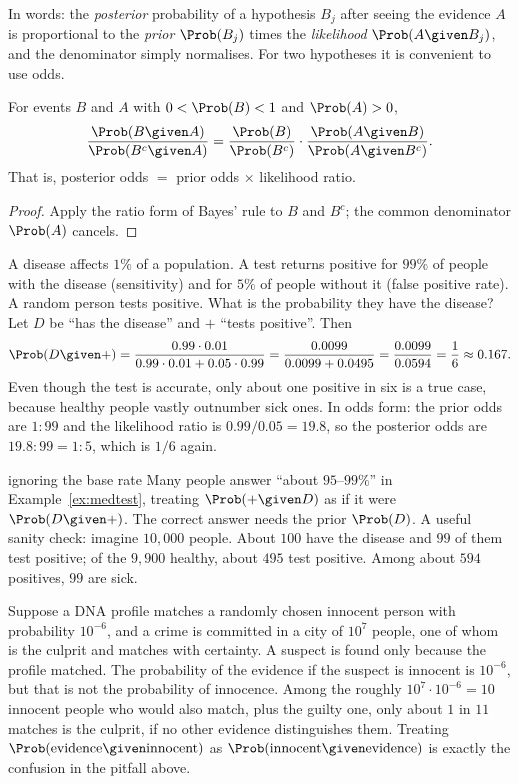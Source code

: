 In words: the \emph{posterior} probability of a hypothesis $B_j$ after seeing the
evidence $A$ is proportional to the \emph{prior} $\Prob(B_j)$ times the
\emph{likelihood} $\Prob(A\given B_j)$, and the denominator simply normalises.
For two hypotheses it is convenient to use odds.

\begin{corollary}
For events $B$ and $A$ with $0<\Prob(B)<1$ and $\Prob(A)>0$,
\[
\frac{\Prob(B\given A)}{\Prob(B^c\given A)}
=\frac{\Prob(B)}{\Prob(B^c)}\cdot\frac{\Prob(A\given B)}{\Prob(A\given B^c)} .
\]
That is, posterior odds $=$ prior odds $\times$ likelihood ratio.
\end{corollary}
\begin{proof}
Apply the ratio form of Bayes' rule to $B$ and $B^c$; the common denominator
$\Prob(A)$ cancels.
\end{proof}

\begin{example}\label{ex:medtest}
A disease affects $1\%$ of a population. A test returns positive for $99\%$ of
people with the disease (sensitivity) and for $5\%$ of people without it (false
positive rate). A random person tests positive. What is the probability they
have the disease? Let $D$ be ``has the disease'' and $+$ ``tests positive''.
Then
\[
\Prob(D\given +)=\frac{0.99\cdot0.01}{0.99\cdot0.01+0.05\cdot0.99}
=\frac{0.0099}{0.0099+0.0495}=\frac{0.0099}{0.0594}=\frac16\approx0.167 .
\]
Even though the test is accurate, only about one positive in six is a true case,
because healthy people vastly outnumber sick ones. In odds form: the prior odds
are $1:99$ and the likelihood ratio is $0.99/0.05=19.8$, so the posterior odds
are $19.8:99=1:5$, which is $1/6$ again.
\end{example}

\begin{pitfall}{ignoring the base rate}
Many people answer ``about $95$--$99\%$'' in Example~\ref{ex:medtest}, treating
$\Prob(+\given D)$ as if it were $\Prob(D\given +)$. The correct answer needs
the prior $\Prob(D)$. A useful sanity check: imagine $10{,}000$ people.
About $100$ have the disease and $99$ of them test positive; of the $9{,}900$
healthy, about $495$ test positive. Among about $594$ positives, $99$ are
sick.
\end{pitfall}

\begin{example}
Suppose a DNA profile matches a randomly chosen innocent person with probability
$10^{-6}$, and a crime is committed in a city of $10^7$ people, one of whom is
the culprit and matches with certainty. A suspect is found only because the
profile matched. The probability of the evidence if the suspect is innocent is
$10^{-6}$, but that is not the probability of innocence. Among the roughly
$10^7\cdot10^{-6}=10$ innocent people who would also match, plus the guilty
one, only about $1$ in $11$ matches is the culprit, if no other evidence
distinguishes them. Treating $\Prob(\text{evidence}\given\text{innocent})$ as
$\Prob(\text{innocent}\given\text{evidence})$ is exactly the confusion in the
pitfall above.
\end{example}

